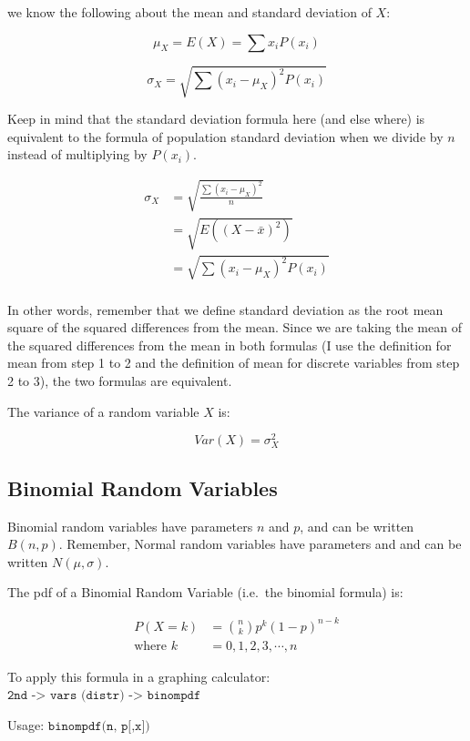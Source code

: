 \documentclass[
]{book}
\begin{document}
we know the following about the mean and standard deviation of \(X\):

\[\mu_X = E(X) = \sum x_i P(x_i)\]

\[\sigma_X = \sqrt{\sum \left( x_i - \mu_X \right) ^2 P \left( x_i \right)}\]

Keep in mind that the standard deviation formula here (and else
where) is equivalent to the formula of population standard deviation
when we divide by \(n\) instead of multiplying by \(P(x_i)\).

\[
\begin{aligned}
\sigma_X &= \sqrt{\frac{\sum(x_i - \mu_X)^2}{n}} \\
&=\sqrt{E((X - \bar x)^2)} \\
&=\sqrt{\sum \left( x_i - \mu_X \right) ^2 P \left( x_i \right)}\\
\end{aligned}
\]

In other words, remember that we define standard deviation as the root
mean square of the squared differences from the mean. Since we are
taking the mean of the squared differences from the mean in both
formulas (I use the definition for mean from step 1 to 2 and the
definition of mean for discrete variables from step 2 to 3), the two
formulas are equivalent.

The variance of a random variable \(X\) is:

\[
Var(X) = \sigma_X^2
\]

\hypertarget{binomial-random-variables}{%
\subsection{Binomial Random Variables}\label{binomial-random-variables}}

Binomial random variables have parameters \(n\) and \(p\), and can be
written \(B(n, p)\). Remember, Normal random variables have parameters and
and can be written \(N(\mu,\sigma)\).

The pdf of a Binomial Random Variable (i.e.~the binomial formula) is:

\[
\begin{aligned}
    P(X=k) &= {n \choose k} p^k (1-p)^{n-k}\\
    \text{where } k &= 0, 1, 2, 3, \cdots, n
\end{aligned}
\]

To apply this formula in a graphing calculator:
\(\texttt{2nd -> vars (distr) -> binompdf}\)

Usage: \(\texttt{binompdf(n, p[,x])}\)
\end{document}
